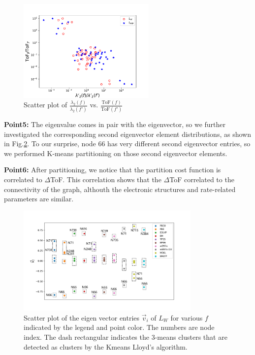 \documentclass[letterpaper,12pt]{article}
\begin{document}
\begin{figure}[h]
    \centering
    \includegraphics[width=0.6\textwidth]{figs/ratio_tof_2ndEigval.pdf}
    \caption{Scatter plot of $\frac{\lambda_{2}(f)}{\lambda_{2}(f')}$ vs. $\frac{\text{ToF}(f)}{\text{ToF}(f')}$}
    \label{fig:d_eig_tof}
\end{figure}


\textbf{Point5:} The eigenvalue comes in pair with the eigenvector, so we further investigated the corresponding second eigenvector element distributions, as shown in Fig.\ref{fig:2ndVecLW}. 
To our surprise, node 66 has very different second eigenvector entries, so we performed K-means partitioning on those second eigenvector elements.

\textbf{Point6:} After partitioning, we notice that the partition cost function is correlated to $\Delta$ToF.
This correlation shows that the $\Delta$ToF correlated to the connectivity of the graph, althouth the electronic structures and rate-related parameters are similar. 

\begin{figure}
    \centering
    \includegraphics[width=0.8\textwidth]{figs/fig_2ndVecLw.png}
    \caption{Scatter plot of the eigen vector entries $\Vec{v}_i$ of $L_W$ for various $f$ indicated by the legend and point color. 
    The numbers are node index. The dash rectangular indicates the 3-means clusters that are detected as clusters by the Kmeans Lloyd's algorithm. }
    \label{fig:2ndVecLW}
\end{figure}
\end{document}
